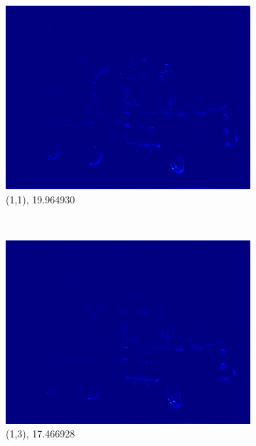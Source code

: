 \documentclass[11pt,a4paper,titlepage]{article}
\begin{document}
\begin{figure}
	\centering
	\begin{subfigure}[t]{0.31\textwidth}
		\includegraphics[width=\textwidth]{results/tiles_legotruck_6x6x480x640_480x640x5_tiling_4x6x200x200_overlap_0.5/MSE_for_view_(1,1).png}
		\caption{(1,1), 19.964930}
	\end{subfigure}%
	~
	\begin{subfigure}[t]{0.31\textwidth}
		\includegraphics[width=\textwidth]{results/tiles_legotruck_6x6x480x640_480x640x5_tiling_4x6x200x200_overlap_0.5/MSE_for_view_(1,3).png}
		\caption{(1,3), 17.466928}
	\end{subfigure}%
	~
	\begin{subfigure}[t]{0.31\textwidth}

\end{subfigure}
\end{figure}
\end{document}
